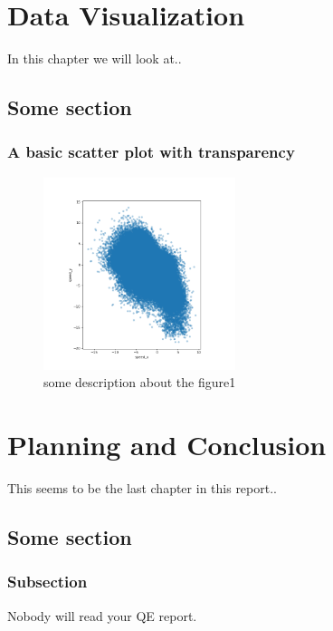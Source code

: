\documentclass[10pt]{report}
\begin{document}
 \chapter{Data Visualization}
 In this chapter we will look at..

\section{Some section}

\subsection{A basic scatter plot with transparency}

\begin{figure}[h!]
    \centering
    \includegraphics[width=0.50\textwidth]{images/figure1.png}
    \caption{some description about the figure1}
    \label{fig: PaleBlueDot}    
\end{figure}
 
 \chapter{Planning and Conclusion}
 This seems to be the last chapter in this report..

\section{Some section}

\subsection{Subsection}
Nobody will read your QE report.


\printbibliography
\end{document}
